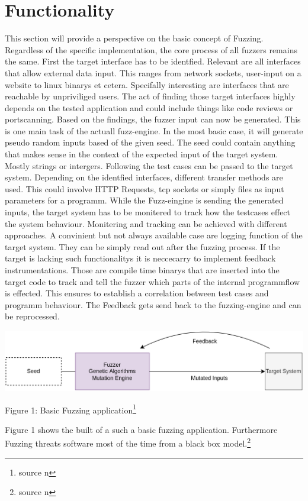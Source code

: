\documentclass[journal=tosc,final]{iacrtrans}
\begin{document}
\section{Functionality}
This section will provide a perspective on the basic concept of Fuzzing. Regardless of the specific implementation, the core process of all fuzzers remains the same. First the target interface has to be identfied. Relevant are all interfaces that allow external data input. This ranges from network sockets, user-input on a website to linux binarys et cetera. Specifally interesting are interfaces that are reachable by unpriviliged users. The act of finding those target interfaces highly depends on the tested application and could include things like code reviews or portscanning. Based on the findings, the fuzzer input can now be generated. This is one main task of the actuall fuzz-engine. In the most basic case, it will generate pseudo random inputs based of the given seed. The seed could contain anything that makes sense in the context of the expected input of the target system. Mostly strings or intergers. Following the test cases can be passed to the  target system. Depending on the identfied interfaces, different transfer methods are used. This could involve HTTP Requests, tcp sockets or simply files as input parameters for a programm. While the Fuzz-eingine is sending the generated inputs, the target system has to be monitered to track how the testcases effect the system behaviour. Monitering and tracking can be achieved with different approaches. A convinient but not always available case are logging function of the target system. They can be simply read out after the fuzzing process. If the target is lacking such functionalitys it is neccecarry to implement feedback instrumentations. Those are compile time binarys that are inserted into the target code to track and tell the fuzzer which parts of the internal programmflow is effected. This ensures to establish a correlation between test cases and programm behaviour. The Feedback gets send back to the fuzzing-engine and can be reprocessed.  
\begin{shaded}

\begin{center}
 \includegraphics[scale=0.2]{../final2.png}
 \end{center}
\begin{center}

 Figure 1: Basic Fuzzing application\footnote{source n}
\end{center}
\end{shaded}
\noindent Figure 1 shows the built of a such a basic fuzzing application.
Furthermore Fuzzing threats software most of the time from a black box model.\footnote{source n} 
\end{document}
